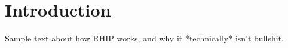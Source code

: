 \chapter{Introduction}
\lipsum[2]
Sample text about how RHIP works, and why it *technically* isn't bullshit.
